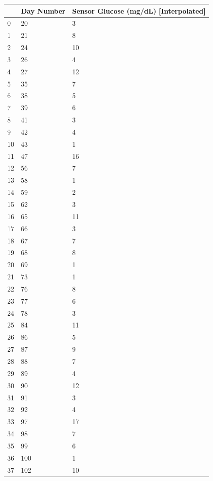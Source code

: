 \bigskip\noindent
\begin{tabular}{p{}p{}p{}}
\toprule
 & Day Number & Sensor Glucose (mg/dL) [Interpolated] \\
\hline
0 & 20 & 3 \\
\hline
1 & 21 & 8 \\
\hline
2 & 24 & 10 \\
\hline
3 & 26 & 4 \\
\hline
4 & 27 & 12 \\
\hline
5 & 35 & 7 \\
\hline
6 & 38 & 5 \\
\hline
7 & 39 & 6 \\
\hline
8 & 41 & 3 \\
\hline
9 & 42 & 4 \\
\hline
10 & 43 & 1 \\
\hline
11 & 47 & 16 \\
\hline
12 & 56 & 7 \\
\hline
13 & 58 & 1 \\
\hline
14 & 59 & 2 \\
\hline
15 & 62 & 3 \\
\hline
16 & 65 & 11 \\
\hline
17 & 66 & 3 \\
\hline
18 & 67 & 7 \\
\hline
19 & 68 & 8 \\
\hline
20 & 69 & 1 \\
\hline
21 & 73 & 1 \\
\hline
22 & 76 & 8 \\
\hline
23 & 77 & 6 \\
\hline
24 & 78 & 3 \\
\hline
25 & 84 & 11 \\
\hline
26 & 86 & 5 \\
\hline
27 & 87 & 9 \\
\hline
28 & 88 & 7 \\
\hline
29 & 89 & 4 \\
\hline
30 & 90 & 12 \\
\hline
31 & 91 & 3 \\
\hline
32 & 92 & 4 \\
\hline
33 & 97 & 17 \\
\hline
34 & 98 & 7 \\
\hline
35 & 99 & 6 \\
\hline
36 & 100 & 1 \\
\hline
37 & 102 & 10 \\

\end{tabular}
